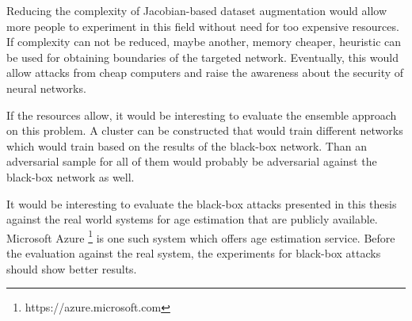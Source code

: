 Reducing the complexity of Jacobian-based dataset augmentation would allow more people to experiment in this field without need for too expensive resources. If complexity can not be reduced, maybe another, memory cheaper, heuristic can be used for obtaining boundaries of the targeted network. Eventually, this would allow attacks from cheap computers and raise the awareness about the security of neural networks.

If the resources allow, it would be interesting to evaluate the ensemble approach on this problem. A cluster can be constructed that would train different networks which would train based on the results of the black-box network. Than an adversarial sample for all of them would probably be adversarial against the black-box network as well.

It would be interesting to evaluate the black-box attacks presented in this thesis against the real world systems for age estimation that are publicly available. Microsoft Azure \footnote{https://azure.microsoft.com} is one such system which offers age estimation service. Before the evaluation against the real system, the experiments for black-box attacks should show better results.